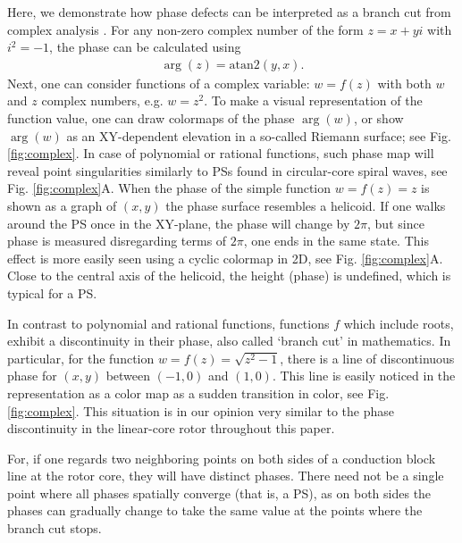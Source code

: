 \documentclass[aps,pre,amsfonts,amssymb,amsmath,twocolumn, superscriptaddress]{revtex4-1}
\begin{document}
Here, we demonstrate how phase defects can be interpreted as a branch cut from complex analysis \citep{Arfken}. For any non-zero complex number of the form $z = x+yi$ with $i^2=-1$, the phase can be calculated using
\begin{align}
    \arg(z) = \mathrm{atan2}(y,x).
\end{align}
Next, one can consider functions of a complex variable: $w= f(z)$ with both $w$ and $z$ complex numbers, e.g. $w=z^2$. To make a visual representation of the function value, one can draw colormaps of the phase $\arg(w)$, or show $\arg(w)$ as an XY-dependent elevation in a so-called Riemann surface; see Fig. \ref{fig:complex}. In case of polynomial or rational functions, such phase map will reveal point singularities similarly to PSs found in circular-core spiral waves, see Fig. \ref{fig:complex}A. When the phase of the simple function $w=f(z) = z$ is shown as a graph of $(x,y)$ the phase surface resembles a helicoid. If one walks around the PS once in the XY-plane, the phase will change by $2\pi$, but since phase is measured disregarding terms of $2\pi$, one ends in the same state. This effect is more easily seen using a cyclic colormap in 2D, see Fig. \ref{fig:complex}A. Close to the central axis of the helicoid, the height (phase) is undefined, which is typical for a PS. 

In contrast to polynomial and rational functions, functions $f$ which include roots, exhibit a discontinuity in their phase, also called `branch cut' in mathematics. In particular, for the function $w= f(z) = \sqrt{z^2-1}$, there is a line of discontinuous phase for $(x,y)$ between $(-1,0) $ and $(1,0)$. This line is easily noticed in the representation as a color map as a sudden transition in color, see Fig. \ref{fig:complex}. This situation is in our opinion very similar to the phase discontinuity in the linear-core rotor throughout this paper. 

For, if one regards two neighboring points on both sides of a conduction block line at the rotor core, they will have distinct phases. There need not be a single point where all phases spatially converge (that is, a PS), as on both sides the phases can gradually change to take the same value at the points where the branch cut stops. 
\end{document}
